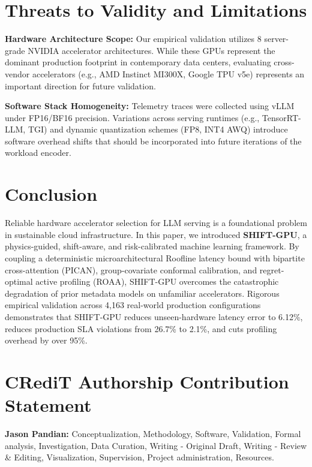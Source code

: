 \documentclass[3p,12pt]{elsarticle}
\begin{document}
\section{Threats to Validity and Limitations}
\label{sec:threats}

\textbf{Hardware Architecture Scope:} Our empirical validation utilizes 8 server-grade NVIDIA accelerator architectures. While these GPUs represent the dominant production footprint in contemporary data centers, evaluating cross-vendor accelerators (e.g., AMD Instinct MI300X, Google TPU v5e) represents an important direction for future validation.

\textbf{Software Stack Homogeneity:} Telemetry traces were collected using vLLM under FP16/BF16 precision. Variations across serving runtimes (e.g., TensorRT-LLM, TGI) and dynamic quantization schemes (FP8, INT4 AWQ) introduce software overhead shifts that should be incorporated into future iterations of the workload encoder.

\section{Conclusion}
\label{sec:conclusion}

Reliable hardware accelerator selection for LLM serving is a foundational problem in sustainable cloud infrastructure. In this paper, we introduced \textbf{SHIFT-GPU}, a physics-guided, shift-aware, and risk-calibrated machine learning framework. By coupling a deterministic microarchitectural Roofline latency bound with bipartite cross-attention (PICAN), group-covariate conformal calibration, and regret-optimal active profiling (ROAA), SHIFT-GPU overcomes the catastrophic degradation of prior metadata models on unfamiliar accelerators. Rigorous empirical validation across 4,163 real-world production configurations demonstrates that SHIFT-GPU reduces unseen-hardware latency error to 6.12\%, reduces production SLA violations from 26.7\% to 2.1\%, and cuts profiling overhead by over 95\%.

\section*{CRediT Authorship Contribution Statement}
\textbf{Jason Pandian:} Conceptualization, Methodology, Software, Validation, Formal analysis, Investigation, Data Curation, Writing - Original Draft, Writing - Review \& Editing, Visualization, Supervision, Project administration, Resources.
\end{document}
